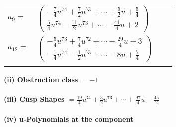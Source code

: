 \documentclass[1p]{elsarticle_modified}
\theoremstyle{definition}
\begin{document}
\begin{tabular}{m{7pt} m{180pt} m{7pt} m{180pt} }
\flushright $a_{9}=$&$\begin{pmatrix}-\frac{7}{4} u^{74}+\frac{7}{2} u^{73}+\cdots+\frac{5}{2} u+\frac{5}{4}\\\frac{5}{4} u^{74}-\frac{11}{2} u^{73}+\cdots-\frac{41}{4} u+2\end{pmatrix}$ \\
\flushright $a_{12}=$&$\begin{pmatrix}-\frac{5}{4} u^{73}+\frac{7}{4} u^{72}+\cdots-\frac{29}{4} u+3\\-\frac{1}{4} u^{74}-\frac{1}{2} u^{73}+\cdots-8 u+\frac{7}{4}\end{pmatrix}$\\&\end{tabular}
\flushleft \textbf{(ii) Obstruction class $= -1$}\\~\\
\flushleft \textbf{(iii) Cusp Shapes $= \frac{19}{4} u^{74}+\frac{3}{2} u^{73}+\cdots+\frac{97}{4} u-\frac{45}{2}$}\\~\\
\newpage\renewcommand{\arraystretch}{1}
\flushleft \textbf{(iv) u-Polynomials at the component}\newline \\
\end{document}
